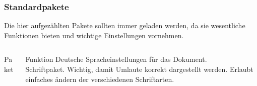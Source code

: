 \begin{frame}[fragile]
    \frametitle{Standardpakete}
    Die hier aufgezählten Pakete sollten immer geladen werden, da sie wesentliche Funktionen bieten und wichtige Einstellungen vornehmen.
    \begin{columns}[T]
        \begin{column}{0.47\textwidth}
            \begin{block}{Paket}
                \begin{lstverbatim}
                \usepackage[ngerman]{babel}

                \usepackage{fontspec}
                \end{lstverbatim}
            \end{block}
        \end{column}
        \begin{column}{0.47\textwidth}
            \begin{block}{Funktion}
                Deutsche Spracheinstellungen für das Dokument. \\
                Schriftpaket. Wichtig, damit Umlaute korrekt dargestellt werden.
                Erlaubt einfaches ändern der verschiedenen Schriftarten.
            \end{block}
        \end{column}
    \end{columns}
\end{frame}
